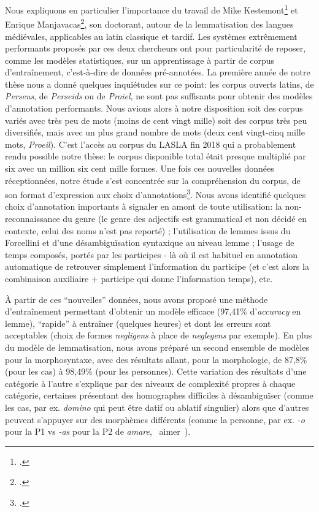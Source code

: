 Nous expliquons en particulier l'importance du travail de Mike Kestemont\footcite{kestemont_lemmatization_2017} et Enrique Manjavacas\footcite{manjavacas_improving_2019}, son doctorant, autour de la lemmatisation des langues médiévales, applicables au latin classique et tardif. Les systèmes extrêmement performants proposés par ces deux chercheurs ont pour particularité de reposer, comme les modèles statistiques, sur un apprentissage à partir de corpus d'entraînement, c'est-à-dire de données pré-annotées. La première année de notre thèse nous a donné quelques inquiétudes sur ce point: les corpus ouverts latins, de \textit{Perseus}, de \textit{Perseids} ou de \textit{Proiel}, ne sont pas suffisants pour obtenir des modèles d'annotation performants. Nous avions alors à notre disposition soit des corpus variés avec très peu de mots (moins de cent vingt mille) soit des corpus très peu diversifiés, mais avec un plus grand nombre de mots (deux cent vingt-cinq mille mots, \textit{Proeil}). C'est l'accès au corpus du LASLA fin 2018 qui a probablement rendu possible notre thèse: le corpus disponible total était presque multiplié par six avec un million six cent mille formes. Une fois ces nouvelles données réceptionnées, notre étude s'est concentrée sur la compréhension du corpus, de son format d'expression aux choix d'annotations\footcite{BodsonCodification1966}. Nous avons identifié quelques choix d'annotation importants à signaler en amont de toute utilisation: la non-reconnaissance du genre (le genre des adjectifs est grammatical et non décidé en contexte, celui des noms n'est pas reporté) ; l'utilisation de lemmes issus du Forcellini et d'une désambiguïsation syntaxique au niveau lemme ; l'usage de temps composés, portés par les participes - là où il est habituel en annotation automatique de retrouver simplement l'information du participe (et c'est alors la combinaison auxiliaire + participe qui donne l'information temps), etc.

À partir de ces \enquote{nouvelles} données, nous avons proposé une méthode d'entraînement permettant d'obtenir un modèle efficace (97,41\% d'\textit{accuracy} en lemme), \enquote{rapide} à entraîner (quelques heures) et dont les erreurs sont acceptables (choix de formes \textit{negligens} à place de \textit{neglegens} par exemple). En plus du modèle de lemmatisation, nous avons préparé un second ensemble de modèles pour la morphosyntaxe, avec des résultats allant, pour la morphologie, de 87,8\% (pour les cas) à 98,49\% (pour les personnes). Cette variation des résultats d'une catégorie à l'autre s'explique par des niveaux de complexité propres à chaque catégorie, certaines présentant des homographes difficiles à désambiguïser (comme les cas, par ex. \textit{domino} qui peut être datif ou ablatif singulier) alors que d'autres peuvent s'appuyer sur des morphèmes différents (comme la personne, par ex. \textit{-o} pour la P1 vs \textit{-as} pour la P2 de \textit{amare}, \og~aimer~\fg{}).

